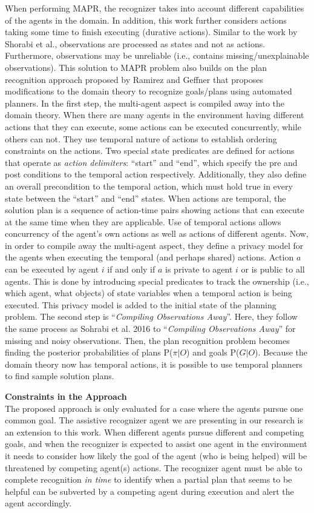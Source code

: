 When performing MAPR, the recognizer takes into account different capabilities of the agents in the domain. In addition, this work further considers actions taking some time to finish executing (durative actions). Similar to the work by Shorabi et al., observations are processed as states and not as actions. Furthermore, observations may be unreliable (i.e., contains missing/unexplainable observations). This solution to MAPR problem also builds on the plan recognition approach proposed by Ramirez and Geffner that proposes modifications to the domain theory to recognize goals/plans using automated planners. In the first step, the multi-agent aspect is compiled away into the domain theory. When there are many agents in the environment having different actions that they can execute, some actions can be executed concurrently, while others can not. They use temporal nature of actions to establish ordering constraints on the actions.  Two special state predicates are defined for actions that operate as \textit{action delimiters}: ``start'' and ``end'', which specify the pre and post conditions to the temporal action respectively. Additionally, they also define an overall precondition to the temporal action, which must hold true in every state between the ``start'' and ``end'' states. When actions are temporal, the solution plan is a sequence of action-time pairs showing actions that can execute at the same time when they are applicable.  Use of temporal actions allows concurrency of the agent's own actions as well as actions of different agents. Now, in order to compile away the multi-agent aspect, they define a privacy model for the agents when executing the temporal (and perhaps shared) actions. Action $a$ can be executed by agent $i$ if and only if $a$ is private to agent $i$ or is public to all agents. This is done by introducing special predicates to track the ownership (i.e., which agent, what objects) of state variables when a temporal action is being executed. This privacy model is added to the initial state of the planning problem. The second step is ``\textit{Compiling Observations Away}''. Here, they follow the same process as Sohrabi et al. 2016 to ``\textit{Compiling Observations Away}'' for missing and noisy observations. Then, the plan recognition problem becomes finding the posterior probabilities of plans P($\pi|O$) and  goals P($G|O$). Because the domain theory now has temporal actions, it is possible to use temporal planners to find sample solution plans.

\noindent\textbf{Constraints in the Approach}\\
The proposed approach is only evaluated for a case where the agents pursue one common goal. The assistive recognizer agent we are presenting in our research is an extension to this work. When different agents pursue different and competing goals, and when the recognizer is expected to assist one agent in the environment it needs to consider how likely the goal of the agent (who is being helped) will be threatened by competing agent(s) actions. The recognizer agent must be  able to complete recognition \textit{in time} to identify when a partial plan that seems to be helpful can be subverted by a competing agent during execution and alert the agent accordingly.



